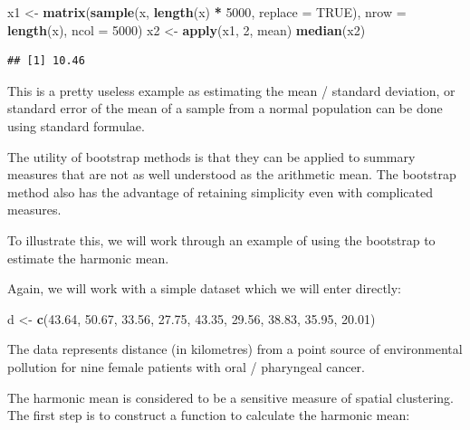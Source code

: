 \documentclass[12pt,a4paper]{book}
\newenvironment{Shaded}{\begin{snugshade}}{\end{snugshade}}
\newcommand{\KeywordTok}[1]{\textcolor[rgb]{0.13,0.29,0.53}{\textbf{#1}}}
\newcommand{\DataTypeTok}[1]{\textcolor[rgb]{0.13,0.29,0.53}{#1}}
\newcommand{\DecValTok}[1]{\textcolor[rgb]{0.00,0.00,0.81}{#1}}
\newcommand{\FloatTok}[1]{\textcolor[rgb]{0.00,0.00,0.81}{#1}}
\newcommand{\StringTok}[1]{\textcolor[rgb]{0.31,0.60,0.02}{#1}}
\newcommand{\OtherTok}[1]{\textcolor[rgb]{0.56,0.35,0.01}{#1}}
\newcommand{\OperatorTok}[1]{\textcolor[rgb]{0.81,0.36,0.00}{\textbf{#1}}}
\newcommand{\NormalTok}[1]{#1}
\theoremstyle{definition}
\theoremstyle{definition}
\theoremstyle{definition}
\theoremstyle{remark}
\begin{document}
\begin{Shaded}
\begin{Highlighting}[]
\NormalTok{x1 <-}\StringTok{ }\KeywordTok{matrix}\NormalTok{(}\KeywordTok{sample}\NormalTok{(x, }\KeywordTok{length}\NormalTok{(x) }\OperatorTok{*}\StringTok{ }\DecValTok{5000}\NormalTok{, }\DataTypeTok{replace =} \OtherTok{TRUE}\NormalTok{),}
             \DataTypeTok{nrow =} \KeywordTok{length}\NormalTok{(x), }\DataTypeTok{ncol =} \DecValTok{5000}\NormalTok{)}
\NormalTok{x2 <-}\StringTok{ }\KeywordTok{apply}\NormalTok{(x1, }\DecValTok{2}\NormalTok{, mean)}
\KeywordTok{median}\NormalTok{(x2)}
\end{Highlighting}
\end{Shaded}

\begin{verbatim}
## [1] 10.46
\end{verbatim}

This is a pretty useless example as estimating the mean / standard
deviation, or standard error of the mean of a sample from a normal
population can be done using standard formulae.

The utility of bootstrap methods is that they can be applied to summary
measures that are not as well understood as the arithmetic mean. The
bootstrap method also has the advantage of retaining simplicity even
with complicated measures.

To illustrate this, we will work through an example of using the
bootstrap to estimate the harmonic mean.

Again, we will work with a simple dataset which we will enter directly:

\begin{Shaded}
\begin{Highlighting}[]
\NormalTok{d <-}\StringTok{ }\KeywordTok{c}\NormalTok{(}\FloatTok{43.64}\NormalTok{, }\FloatTok{50.67}\NormalTok{, }\FloatTok{33.56}\NormalTok{, }\FloatTok{27.75}\NormalTok{, }\FloatTok{43.35}\NormalTok{, }\FloatTok{29.56}\NormalTok{, }\FloatTok{38.83}\NormalTok{, }\FloatTok{35.95}\NormalTok{, }\FloatTok{20.01}\NormalTok{)}
\end{Highlighting}
\end{Shaded}

The data represents distance (in kilometres) from a point source of
environmental pollution for nine female patients with oral / pharyngeal
cancer.

The harmonic mean is considered to be a sensitive measure of spatial
clustering. The first step is to construct a function to calculate the
harmonic mean:
\end{document}
